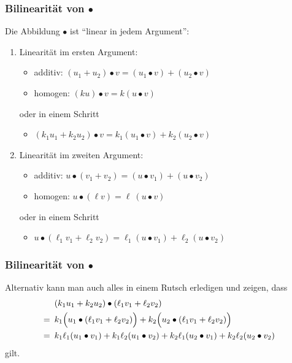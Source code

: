 \documentclass{beamer}
\begin{document}
\begin{frame} \frametitle{Bilinearität von $\bullet$}
    Die Abbildung $\bullet$ ist \enquote{linear in jedem Argument}:
    \begin{enumerate}
        \item Linearität im ersten Argument:
        \begin{itemize}
            \item additiv: $(u_1 + u_2) \bullet v = (u_1 \bullet v) + (u_2 \bullet v)$
            \item homogen: $(k u) \bullet v = k (u \bullet v)$
        \end{itemize}
        \smallskip oder in einem Schritt \smallskip
        \begin{itemize}
            \item $(k_1 u_1 + k_2 u_2) \bullet v = k_1 (u_1 \bullet v) + k_2 (u_2 \bullet v)$
        \end{itemize}
        \medskip
        \item Linearität im zweiten Argument:
        \begin{itemize}
            \item additiv: $u \bullet (v_1 + v_2) = (u \bullet v_1) + (u \bullet v_2)$
            \item homogen: $u \bullet (\ell v) = \ell \ (u \bullet v)$
        \end{itemize}
        \smallskip oder in einem Schritt \smallskip
        \begin{itemize}
            \item $u \bullet (\ell_1 v_1 + \ell_2 v_2) = \ell_1 (u \bullet v_1) + \ell_2 (u \bullet v_2)$
        \end{itemize}
    \end{enumerate}
\end{frame}

\begin{frame} \frametitle{Bilinearität von $\bullet$}
    Alternativ kann man auch alles in einem Rutsch erledigen und zeigen, dass
    \begin{align*}
        &(k_1 u_1 + k_2 u_2) \bullet (\ell_1 v_1 + \ell_2 v_2) \\
        = \enskip
        &
        k_1 \Big(u_1 \bullet (\ell_1 v_1 + \ell_2 v_2) \Big) + k_2 \Big(u_2 \bullet (\ell_1 v_1 + \ell_2 v_2) \Big) \\
        = \enskip
        &
        k_1 \ell_1 (u_1 \bullet v_1) + k_1 \ell_2 (u_1 \bullet v_2) + k_2 \ell_1 (u_2 \bullet v_1) + k_2 \ell_2 (u_2 \bullet v_2)
    \end{align*}
    gilt.
\end{frame}
\end{document}
